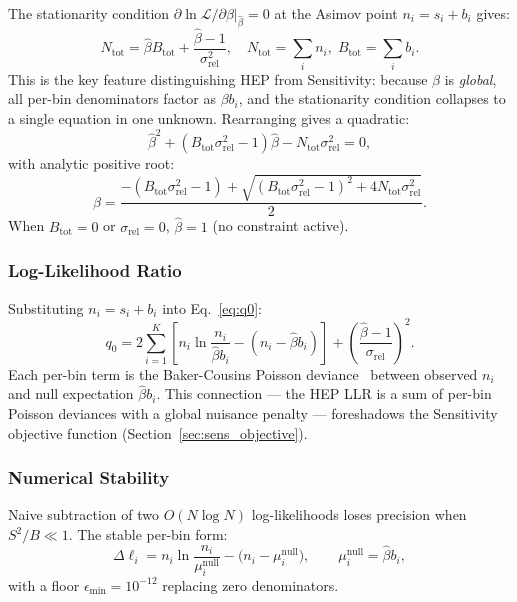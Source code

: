 \documentclass[12pt,a4paper]{article}
\newcommand{\bhat}{\hat{\beta}}
\newcommand{\srel}{\sigma_{\mathrm{rel}}}
\newcommand{\srelsq}{\sigma_{\mathrm{rel}}^{2}}
\newcommand{\Btot}{B_{\mathrm{tot}}}
\newcommand{\Ntot}{N_{\mathrm{tot}}}
\newcommand{\minexp}{\epsilon_{\min}}
\begin{document}
The stationarity condition $\partial\ln\mathcal{L}/\partial\beta|_{\bhat}=0$
at the Asimov point $n_i=s_i+b_i$ gives:
\begin{equation}
  \Ntot = \bhat\Btot + \frac{\bhat-1}{\srelsq},
  \quad
  \Ntot = \sum_i n_i,\;\Btot = \sum_i b_i.
  \label{eq:stationarity}
\end{equation}
This is the key feature distinguishing HEP from Sensitivity: because $\beta$
is \emph{global}, all per-bin denominators factor as $\beta b_i$, and the
stationarity condition collapses to a single equation in one unknown.
Rearranging gives a quadratic:
\begin{equation}
  \bhat^2 + \left(\Btot\srelsq-1\right)\bhat - \Ntot\srelsq = 0,
  \label{eq:beta_quadratic}
\end{equation}
with analytic positive root:
\begin{equation}
  \bhat = \frac{-(B_{\mathrm{tot}}\srelsq-1)
    + \sqrt{(B_{\mathrm{tot}}\srelsq-1)^2 + 4\Ntot\srelsq}}{2}.
  \label{eq:beta_solution}
\end{equation}
When $\Btot=0$ or $\srel=0$, $\bhat=1$ (no constraint active).

\subsubsection{Log-Likelihood Ratio}
\label{sec:llr}

Substituting $n_i = s_i+b_i$ into Eq.~\eqref{eq:q0}:
\begin{equation}
  q_0 = 2\sum_{i=1}^{K}
    \left[n_i\ln\!\frac{n_i}{\bhat b_i} - (n_i-\bhat b_i)\right]
    + \left(\frac{\bhat-1}{\srel}\right)^{\!2}.
  \label{eq:q0_expanded}
\end{equation}
Each per-bin term is the Baker-Cousins Poisson deviance~\cite{BakerCousins1984}
between observed $n_i$ and null expectation $\bhat b_i$.
This connection — the HEP LLR is a sum of per-bin Poisson deviances with a
global nuisance penalty — foreshadows the Sensitivity objective function
(Section~\ref{sec:sens_objective}).

\subsubsection{Numerical Stability}
\label{sec:pl_numerical}

Naive subtraction of two $O(N\log N)$ log-likelihoods loses precision when
$S^2/B\ll 1$.  The stable per-bin form:
\begin{equation}
  \Delta\ell_i = n_i\ln\!\frac{n_i}{\mu_i^{\mathrm{null}}}
    - \bigl(n_i - \mu_i^{\mathrm{null}}\bigr),
  \qquad
  \mu_i^{\mathrm{null}} = \bhat b_i,
  \label{eq:stable_llr}
\end{equation}
with a floor $\minexp=10^{-12}$ replacing zero denominators.
\end{document}
